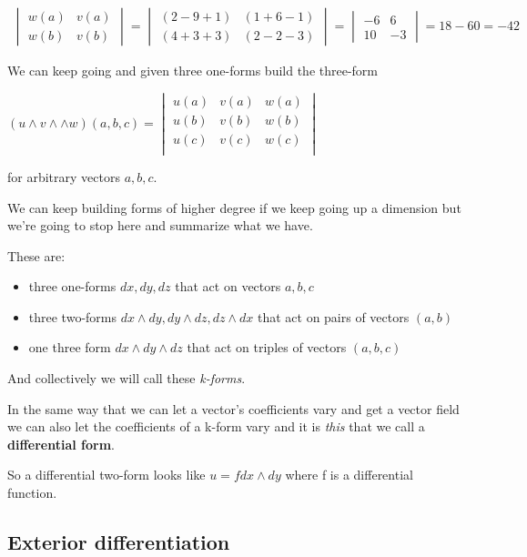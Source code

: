 \documentclass{article}
\begin{document}
\begin{align*}
  \begin{vmatrix}
    w (a) & v(a) \\
    w (b) & v(b)
  \end{vmatrix} =
  \begin{vmatrix}
    (2 - 9 + 1) & (1 + 6 - 1) \\
    (4 + 3 + 3) & (2 - 2 -3)
  \end{vmatrix} =
  \begin{vmatrix}
    -6 & 6 \\
    10 & -3 
  \end{vmatrix} = 18 - 60 = -42
\end{align*}

We can keep going and given three one-forms build the three-form

$
(u \wedge v \wedge \wedge w) (a, b, c) =
\begin{vmatrix}
  u (a) & v (a) & w (a) \\
  u (b) & v (b) & w (b) \\
  u (c) & v (c) & w (c) \\
\end{vmatrix}
$

for arbitrary vectors $a, b, c$.

We can keep building forms of higher degree if we keep going up a dimension but
we're going to stop here and summarize what we have.

These are:

\begin{itemize}
  \item three one-forms $dx, dy, dz$ that act on vectors $a, b, c$
  \item three two-forms $dx \wedge dy, dy \wedge dz, dz \wedge dx$ that act on
    pairs of vectors $(a, b)$
  \item one three form $dx \wedge dy \wedge dz$ that act on triples of vectors
    $(a, b, c)$
\end{itemize}

And collectively we will call these \textit{k-forms}.

In the same way that we can let a vector's coefficients vary and get a vector
field we can also let the coefficients of a k-form vary and
it is \textit{this} that we call a \textbf{differential form}.

So a differential two-form looks like $u = f dx \wedge dy$ where f is a
differential function.

\subsection {Exterior differentiation}
\end{document}
